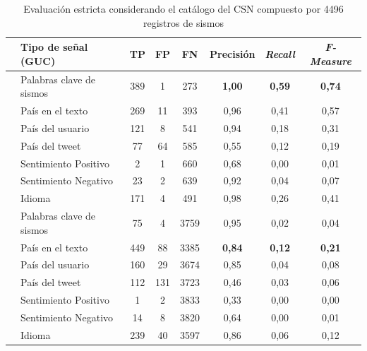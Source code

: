 \begin{table}[!ht]
\centering
  \begin{tabular}{c|lcccccc}
    \toprule
    & \multicolumn{1}{l}{{Tipo de señal (GUC)}}&\multicolumn{1}{c}{{TP}}&\multicolumn{1}{c}{{FP}}&\multicolumn{1}{c}{{FN}}&\multicolumn{1}{c}{{Precisión}}&\multicolumn{1}{c}{{\em Recall}}&\multicolumn{1}{c}{{\em F-Measure}}\\
    \midrule
    \parbox[t]{1.5mm}{\vspace{-0.3cm}}
    & {Palabras clave de sismos} & 389 & 1 & 273 & {{\bf 1,00}} &  {{\bf 0,59}} & {{\bf 0,74}} \\
	& {País en el texto } & 269 & 11 & 393 & {0,96} & {0,41} & {0,57} \\    
    & {País del usuario} & 121 & 8 & 541  & {0,94} & {0,18} & {0,31} \\
    & {País del tweet} & 77 & 64 & 585 & {0,55} & {0,12} & {0,19} \\  
    & {Sentimiento Positivo} & 2 & 1 & 660 & {0,68} &	{0,00} & {0,01} \\
    & {Sentimiento Negativo} & 23 & 2 & 639 & {0,92} &	{0,04} & {0,07} \\
    & {Idioma} & 171 & 4 & 491 & {0,98} & {0,26} & {0,41} \\
    \midrule
    \parbox[t]{1.5mm}{\vspace{-0.3cm}}
	& {Palabras clave de sismos} & 75 & 4 & 3759 & {0,95} & {0,02} & {0,04} \\
	& {País en el texto} & 449 & 88 & 3385 & {\bf 0,84} & {\bf 0,12} & {\bf 0,21} \\
	& {País del usuario} & 160 & 29 & 3674 & {0,85} & {0,04} & {0,08} \\
	& {País del tweet} & 112 & 131 & 3723 & {0,46} & {0,03} & {0,06} \\ 
	& {Sentimiento Positivo} & 1 & 2 & 3833 & {0,33} & {0,00} & {0,00} \\
	& {Sentimiento Negativo} & 14 & 8 & 3820 & {0,64} &	{0,00} & {0,01} \\
	& {Idioma} & 239 & 40 & 3597 & {0,86} & {0,06} & {0,12} \\
    \bottomrule
  \end{tabular}
  \caption{{Evaluación estricta considerando el catálogo del CSN compuesto por 4496 registros de sismos}}
  \label{table:local-strict}
\end{table}


